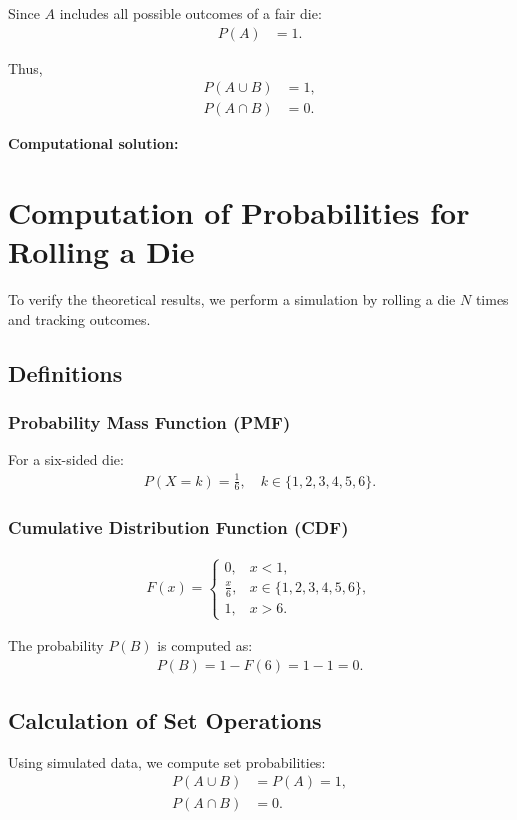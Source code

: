 \documentclass[journal]{IEEEtran}
\begin{document}
Since \( A \) includes all possible outcomes of a fair die:
\begin{align}
    P(A) &= 1.
\end{align}

Thus,
\begin{align}
    P(A \cup B) &= 1, \\
    P(A \cap B) &= 0.
\end{align}

\textbf{Computational solution: }\\
\section*{Computation of Probabilities for Rolling a Die}
To verify the theoretical results, we perform a simulation by rolling a die \( N \) times and tracking outcomes.

\subsection*{Definitions}
\subsubsection*{Probability Mass Function (PMF)}
For a six-sided die:
\begin{align}
    P(X = k) = \frac{1}{6}, \quad k \in \{1,2,3,4,5,6\}.
\end{align}

\subsubsection*{Cumulative Distribution Function (CDF)}
\begin{align}
F(x) = \begin{cases} 
0, & x < 1, \\
\frac{x}{6}, & x \in \{1,2,3,4,5,6\}, \\
1, & x > 6.
\end{cases}
\end{align}

The probability \( P(B) \) is computed as:
\begin{align}
    P(B) = 1 - F(6) = 1 - 1 = 0.
\end{align}

\subsection*{Calculation of Set Operations}
Using simulated data, we compute set probabilities:
\begin{align}
    P(A \cup B) &= P(A) = 1, \\
    P(A \cap B) &= 0. \\
\end{align}
\end{document}
